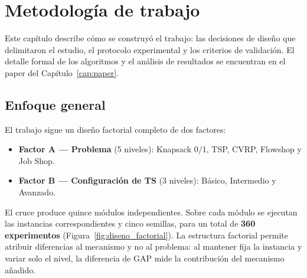 \chapter{Metodología de trabajo}
\label{cap:metodologia}

Este capítulo describe cómo se construyó el trabajo: las decisiones de diseño
que delimitaron el estudio, el protocolo experimental y los criterios de
validación. El detalle formal de los algoritmos y el análisis de resultados
se encuentran en el paper del Capítulo~\ref{cap:paper}.

\section{Enfoque general}

El trabajo sigue un diseño factorial completo de dos factores:

\begin{itemize}
  \item \textbf{Factor A --- Problema} (5 niveles): Knapsack 0/1, TSP, CVRP,
    Flowshop y Job Shop.
  \item \textbf{Factor B --- Configuración de TS} (3 niveles): Básico,
    Intermedio y Avanzado.
\end{itemize}

El cruce produce quince módulos independientes. Sobre cada módulo se ejecutan
las instancias correspondientes y cinco semillas, para un total de
\textbf{360 experimentos} (Figura~\ref{fig:diseno_factorial}). La estructura
factorial permite atribuir diferencias al mecanismo y no al problema: al
mantener fija la instancia y variar solo el nivel, la diferencia de GAP mide
la contribución del mecanismo añadido.

